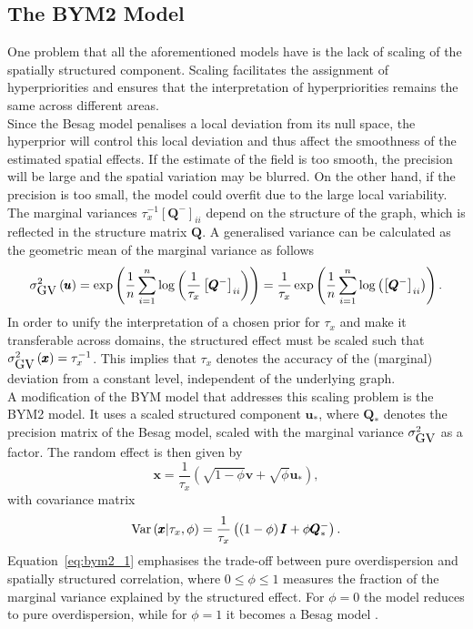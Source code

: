 \subsection{The BYM2 Model}
One problem that all the aforementioned models have is the lack of scaling of the spatially structured component. Scaling facilitates the assignment of hyperpriorities and ensures that the interpretation of hyperpriorities remains the same across different areas. \\
Since the Besag model penalises a local deviation from its null space, the hyperprior will control this local deviation and thus affect the smoothness of the estimated spatial effects. If the estimate of the field is too smooth, the precision will be large and the spatial variation may be blurred. On the other hand, if the precision is too small, the model could overfit due to the large local variability. \\
The marginal variances $\tau_x^{-1}\left[\pmb{Q}^{-}\right]_{ii}$ depend on the structure of the graph, which is reflected in the structure matrix $\pmb{Q}$. A generalised variance can be calculated as the geometric mean of the marginal variance as follows
\begin{equation}\label{eq:bym_scale}
    \sigma_{\hbox{GV}}^2\left(\pmb{u}\right)=\exp\left(\frac{1}{n}\sum_{i=1}^n\log\left(\frac{1}{\tau_x}\left[\pmb{Q}^{-}\right]_{ii}\right)\right)=\frac{1}{\tau_x}\exp\left(\frac{1}{n}\sum_{i=1}^n\log\left(\left[\pmb{Q}^{-}\right]_{ii}\right)\right).
\end{equation}
In order to unify the interpretation of a chosen prior for $\tau_x$ and make it transferable across domains, the structured effect must be scaled such that $\sigma_{\hbox{GV}}^2\left(\pmb{x}\right)=\tau_x^{-1}$. This implies that $\tau_x$ denotes the accuracy of the (marginal) deviation from a constant level, independent of the underlying graph. \\
A modification of the BYM model that addresses this scaling problem is the BYM2 model. It uses a scaled structured component $\pmb{u}_{*}$, where $\pmb{Q}_{*}$ denotes the precision matrix of the Besag model, scaled with the marginal variance $\sigma_{\hbox{GV}}^2$ as a factor. The random effect is then given by
\begin{equation}\label{eq:bym2_1}
    \pmb{x}=\frac{1}{\tau_x}\left(\sqrt{1-\phi}\pmb{v}+\sqrt{\phi}\pmb{u}_{*}\right),
\end{equation}
with covariance matrix
\begin{equation}
    \hbox{Var}\left(\pmb{x}|\tau_x,\phi\right)=\frac{1}{\tau_x}\left(\left(1-\phi\right)\pmb{I}+\phi\pmb{Q}_{*}^{-}\right).
\end{equation}
Equation~\ref{eq:bym2_1} emphasises the trade-off between pure overdispersion and spatially structured correlation, where $0\leq\phi\leq1$ measures the fraction of the marginal variance explained by the structured effect. For $\phi=0$ the model reduces to pure overdispersion, while for $\phi=1$ it becomes a Besag model \autocite[][]{martins2014penalising, riebler2016intuitive}.
\clearpage
